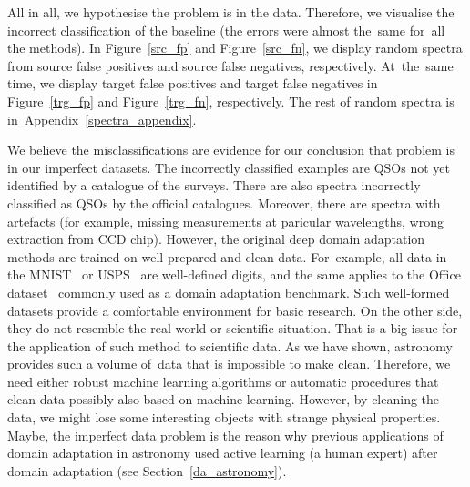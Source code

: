 All in all, we hypothesise the problem is in the data.
Therefore, we visualise the incorrect classification of the baseline
(the errors were almost the~same for~all the methods).
In Figure~\ref{src_fp} and Figure~\ref{src_fn},
we display random spectra from source false positives and source false negatives, respectively.
At~the~same time, we display target false positives and target false negatives in Figure~\ref{trg_fp} and Figure~\ref{trg_fn}, respectively.
The rest of random spectra is in~Appendix~\ref{spectra_appendix}.

We believe the misclassifications are evidence for our conclusion
that problem is in our imperfect datasets.
The incorrectly classified examples are QSOs not yet identified by a catalogue of the surveys.
There are also spectra incorrectly classified as QSOs by the official catalogues.
Moreover, there are spectra with artefacts
(for example, missing measurements at paricular wavelengths, wrong extraction from CCD chip). 
However, the original deep domain adaptation methods are trained on well-prepared and clean data.
For~example, all data in the MNIST~\cite{lecun1998} or USPS~\cite{hull1994} are well-defined digits,
and the same applies to the Office dataset~\cite{saenko2010} commonly used as a domain adaptation benchmark.
Such well-formed datasets provide a comfortable environment for basic research.
On the other side, they do not resemble the real world or scientific situation.
That is a big issue for the application of such method to scientific data.
As we have shown, astronomy provides such a volume of~data that is impossible to make clean.
Therefore, we need either robust machine learning algorithms
or automatic procedures that clean data possibly also based on machine learning.
However, by cleaning the data, we might lose some interesting objects with strange physical properties.
Maybe, the imperfect data problem is the reason
why previous applications of domain adaptation in astronomy used active learning (a human expert)
after domain adaptation (see Section~\ref{da_astronomy}).

